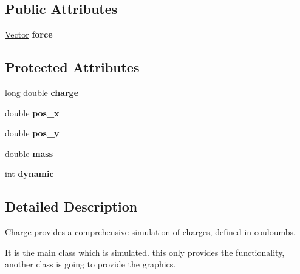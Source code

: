 \subsection*{Public Attributes}
\begin{DoxyCompactItemize}
\item 
\hypertarget{classCharge_af612be5938bad2d0d27205068c0195fd}{\hyperlink{classVector}{Vector} {\bfseries force}}\label{classCharge_af612be5938bad2d0d27205068c0195fd}

\end{DoxyCompactItemize}
\subsection*{Protected Attributes}
\begin{DoxyCompactItemize}
\item 
\hypertarget{classCharge_a287d69a11fc4a7eb0d95970b98fe27d4}{long double {\bfseries charge}}\label{classCharge_a287d69a11fc4a7eb0d95970b98fe27d4}

\item 
\hypertarget{classCharge_aa30b984fb048bfaca2420f10938242fc}{double {\bfseries pos\-\_\-x}}\label{classCharge_aa30b984fb048bfaca2420f10938242fc}

\item 
\hypertarget{classCharge_a14b5ad806eec064ef6ae4071d999e7bc}{double {\bfseries pos\-\_\-y}}\label{classCharge_a14b5ad806eec064ef6ae4071d999e7bc}

\item 
\hypertarget{classCharge_a9e50eb31fbd69d2b5e2057c18f7daf5d}{double {\bfseries mass}}\label{classCharge_a9e50eb31fbd69d2b5e2057c18f7daf5d}

\item 
\hypertarget{classCharge_a2510c3e34f4482a29eb8e5ff7f4f9f48}{int {\bfseries dynamic}}\label{classCharge_a2510c3e34f4482a29eb8e5ff7f4f9f48}

\end{DoxyCompactItemize}


\subsection{Detailed Description}
\hyperlink{classCharge}{Charge} provides a comprehensive simulation of charges, defined in couloumbs. 

It is the main class which is simulated. this only provides the functionality, another class is going to provide the graphics. 

